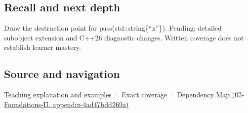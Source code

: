 \subsection{Recall and next depth}\label{recall-and-next-depth}

Draw the destruction point for pass(std::string\{``x''\}). Pending: detailed subobject extension and C++26 diagnostic changes. Written coverage does not establish learner mastery.

\subsection{Source and navigation}\label{source-and-navigation}

\href{Continuous\%20Notes/Computing\%20Foundations\%20-\%20From\%20Bits\%20to\%20C++\%20and\%20Systems\%20APIs\#A\%20temporary\%20needs\%20an\%20explicit\%20lifetime\%20story}{Teaching explanation and examples} · \hyperref[appendix-fd090d982a15]{Exact coverage} · \href{}{Dependency Map (02-Foundations-II, appendix-4ad47bdd269a)}

